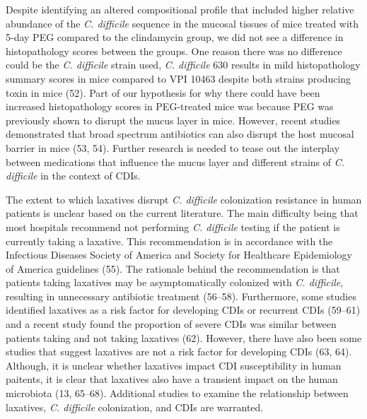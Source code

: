 \documentclass[
  11pt,
]{article}
\begin{document}
Despite identifying an altered compositional profile that included
higher relative abundance of the \emph{C. difficile} sequence in the
mucosal tissues of mice treated with 5-day PEG compared to the
clindamycin group, we did not see a difference in histopathology scores
between the groups. One reason there was no difference could be the
\emph{C. difficile} strain used, \emph{C. difficile} 630 results in mild
histopathology summary scores in mice compared to VPI 10463 despite both
strains producing toxin in mice (52). Part of our hypothesis for why
there could have been increased histopathology scores in PEG-treated
mice was because PEG was previously shown to disrupt the mucus layer in
mice. However, recent studies demonstrated that broad spectrum
antibiotics can also disrupt the host mucosal barrier in mice (53, 54).
Further research is needed to tease out the interplay between
medications that influence the mucus layer and different strains of
\emph{C. difficile} in the context of CDIs.

The extent to which laxatives disrupt \emph{C. difficile} colonization
resistance in human patients is unclear based on the current literature.
The main difficulty being that most hospitals recommend not performing
\emph{C. difficile} testing if the patient is currently taking a
laxative. This recommendation is in accordance with the Infectious
Diseases Society of America and Society for Healthcare Epidemiology of
America guidelines (55). The rationale behind the recommendation is that
patients taking laxatives may be asymptomatically colonized with
\emph{C. difficile}, resulting in unnecessary antibiotic treatment
(56--58). Furthermore, some studies identified laxatives as a risk
factor for developing CDIs or recurrent CDIs (59--61) and a recent study
found the proportion of severe CDIs was similar between patients taking
and not taking laxatives (62). However, there have also been some
studies that suggest laxatives are not a risk factor for developing CDIs
(63, 64). Although, it is unclear whether laxatives impact CDI
susceptibility in human paitents, it is clear that laxatives also have a
transient impact on the human microbiota (13, 65--68). Additional
studies to examine the relationship between laxatives, \emph{C.
difficile} colonization, and CDIs are warranted.
\end{document}

